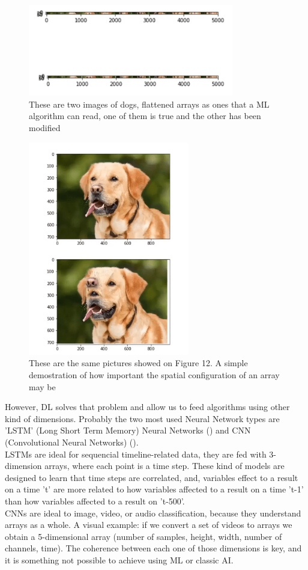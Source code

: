 \documentclass[openany]{article}
\begin{document}
\begin{figure}[!h]
    \centering
    \includegraphics[width=0.8\textwidth]{FlattenedImage.png}
    \caption{These are two images of dogs, flattened arrays as ones that a ML algorithm can read, one of them is true and the other has been modified}
    \label{fig:my_label}
\end{figure}

\begin{figure}[!h]
    \centering
    \includegraphics[width=7cm]{NonFlattenedDog.png}
    \caption{These are the same pictures showed on Figure 12. A simple demostration of how important the spatial configuration of an array may be}
    \label{fig:my_label}
\end{figure}


However, DL solves that problem and allow us to feed algorithms using other kind of dimensions. Probably the two most used Neural Network types are 'LSTM' (Long Short Term Memory) Neural Networks (\cite{LSTM}) and CNN (Convolutional Neural Networks) (\cite{DBLP:journals/corr/OSheaN15}). \\
LSTMs are ideal for sequencial timeline-related data, they are fed with 3-dimension arrays, where each point is a time step. These kind of models are designed to learn that time steps are correlated, and, variables effect to a result on a time 't' are more related to how variables affected to a result on a time 't-1' than how variables affected to a result on 't-500'. \\
CNNs are ideal to image, video, or audio classification, because they understand arrays as a whole. A visual example: if we convert a set of videos to arrays we obtain a 5-dimensional array (number of samples, height, width, number of channels, time). The coherence between each one of those dimensions is key, and it is something not possible to achieve using ML or classic AI.
\end{document}
